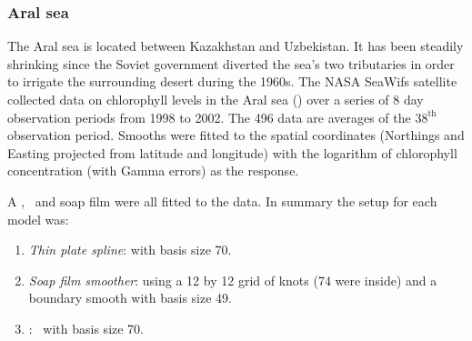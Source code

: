 \subsubsection{Aral sea}
\label{aral-sec}

The Aral sea is located between Kazakhstan and Uzbekistan. It has been steadily shrinking since the Soviet government diverted the sea's two tributaries in order to irrigate the surrounding desert during the 1960s. The NASA SeaWifs satellite collected data on chlorophyll levels in the Aral sea (\cite{soap}) over a series of 8 day observation periods from 1998 to 2002. The 496 data are averages of the $38^\text{th}$ observation period. Smooths were fitted to the spatial coordinates (Northings and Easting projected from latitude and longitude) with the logarithm of chlorophyll concentration (with Gamma errors) as the response.

A \tprs, \mdsap\ and soap film were all fitted to the data. In summary the setup for each model was:

\begin{enumerate}
\item \emph{Thin plate spline}:  with basis size 70.
\item \emph{Soap film smoother}: using a 12 by 12 grid of knots (74 were inside) and a boundary smooth with basis size 49.
\item \emph{\mdsap}: \tprs\ with basis size 70.
\end{enumerate}

